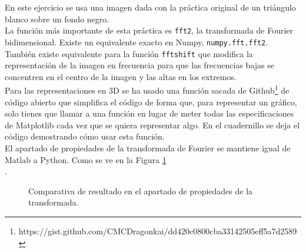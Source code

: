 \documentclass[a4paper,12pt]{report}
\begin{document}
En este ejercicio se usa una imagen dada con la práctica original de un triángulo blanco sobre un fondo negro.\\

La función más importante de esta práctica es \texttt{fft2}, la transformada de Fourier bidimensional. Existe un equivalente exacto en Numpy,  \texttt{numpy.fft.fft2}. También existe equivalente para la función \texttt{fftshift} que modifica la representación de la imagen en frecuencia para que las frecuencias bajas se concentren en el centro de la imagen y las altas en los extremos.\\

Para las representaciones en 3D se ha usado una función sacada de Github\footnote{https://gist.github.com/CMCDragonkai/dd420c0800cba33142505eff5a7d2589} de código abierto que simplifica el código de forma que, para representar un gráfico, solo tienes que llamar a una función en lugar de meter todas las especificaciones de Matplotlib cada vez que se quiera representar algo. En el cuadernillo se deja el código demostrando cómo usar esta función.\\

El apartado de propiedades de la transformada de Fourier se mantiene igual de Matlab a Python. Como se ve en la Figura \ref{zoom}\\.

\begin{figure}[!tbp]
  \centering
  \hfill
  \caption{Comparativa de resultado en el apartado de propiedades de la transformada.}
  \label{zoom}
\end{figure}
\end{document}
